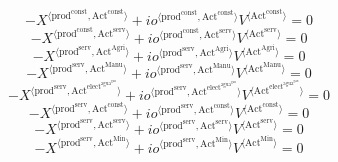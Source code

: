 \begin{equation}
-{X}^{\langle \mathrm{prod}^{\mathrm{const}},\mathrm{Act}^{\mathrm{const}}\rangle} + {{{i\!o}}^{\langle \mathrm{\mathrm{prod}^{\mathrm{const}}},\mathrm{\mathrm{Act}^{\mathrm{const}}}\rangle}} {{V}^{\langle \mathrm{Act}^{\mathrm{const}}\rangle}} = 0
\end{equation}
\begin{equation}
-{X}^{\langle \mathrm{prod}^{\mathrm{const}},\mathrm{Act}^{\mathrm{serv}}\rangle} + {{{i\!o}}^{\langle \mathrm{\mathrm{prod}^{\mathrm{const}}},\mathrm{\mathrm{Act}^{\mathrm{serv}}}\rangle}} {{V}^{\langle \mathrm{Act}^{\mathrm{serv}}\rangle}} = 0
\end{equation}
\begin{equation}
-{X}^{\langle \mathrm{prod}^{\mathrm{serv}},\mathrm{Act}^{\mathrm{Agri}}\rangle} + {{{i\!o}}^{\langle \mathrm{\mathrm{prod}^{\mathrm{serv}}},\mathrm{\mathrm{Act}^{\mathrm{Agri}}}\rangle}} {{V}^{\langle \mathrm{Act}^{\mathrm{Agri}}\rangle}} = 0
\end{equation}
\begin{equation}
-{X}^{\langle \mathrm{prod}^{\mathrm{serv}},\mathrm{Act}^{\mathrm{Manu}}\rangle} + {{{i\!o}}^{\langle \mathrm{\mathrm{prod}^{\mathrm{serv}}},\mathrm{\mathrm{Act}^{\mathrm{Manu}}}\rangle}} {{V}^{\langle \mathrm{Act}^{\mathrm{Manu}}\rangle}} = 0
\end{equation}
\begin{equation}
-{X}^{\langle \mathrm{prod}^{\mathrm{serv}},\mathrm{Act}^{\mathrm{elect}^{\mathrm{agua}^{\mathrm{gas}}}}\rangle} + {{{i\!o}}^{\langle \mathrm{\mathrm{prod}^{\mathrm{serv}}},\mathrm{\mathrm{Act}^{\mathrm{elect}^{\mathrm{agua}^{\mathrm{gas}}}}}\rangle}} {{V}^{\langle \mathrm{Act}^{\mathrm{elect}^{\mathrm{agua}^{\mathrm{gas}}}}\rangle}} = 0
\end{equation}
\begin{equation}
-{X}^{\langle \mathrm{prod}^{\mathrm{serv}},\mathrm{Act}^{\mathrm{const}}\rangle} + {{{i\!o}}^{\langle \mathrm{\mathrm{prod}^{\mathrm{serv}}},\mathrm{\mathrm{Act}^{\mathrm{const}}}\rangle}} {{V}^{\langle \mathrm{Act}^{\mathrm{const}}\rangle}} = 0
\end{equation}
\begin{equation}
-{X}^{\langle \mathrm{prod}^{\mathrm{serv}},\mathrm{Act}^{\mathrm{serv}}\rangle} + {{{i\!o}}^{\langle \mathrm{\mathrm{prod}^{\mathrm{serv}}},\mathrm{\mathrm{Act}^{\mathrm{serv}}}\rangle}} {{V}^{\langle \mathrm{Act}^{\mathrm{serv}}\rangle}} = 0
\end{equation}
\begin{equation}
-{X}^{\langle \mathrm{prod}^{\mathrm{serv}},\mathrm{Act}^{\mathrm{Min}}\rangle} + {{{i\!o}}^{\langle \mathrm{\mathrm{prod}^{\mathrm{serv}}},\mathrm{\mathrm{Act}^{\mathrm{Min}}}\rangle}} {{V}^{\langle \mathrm{Act}^{\mathrm{Min}}\rangle}} = 0
\end{equation}
